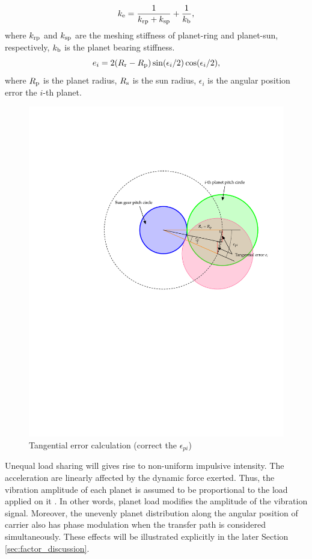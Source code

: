 \documentclass[a4paper,fleqn]{cas-sc}%
\begin{document}
\begin{equation}
    k_{\rm e}=\frac{1}{k_{\rm rp}+k_{\rm sp}}+\frac{1}{k_{\rm b}},\label{eq:stiffness}
\end{equation}
where $k_{\rm rp}$ and $k_{\rm sp}$ are the meshing stiffness of planet-ring and planet-sun, respectively, $k_{\rm b}$ is the planet bearing stiffness.
\begin{equation}
    e_{i}=2(R_{\rm r}-R_{\rm p})\sin(\epsilon_{i}/2)\cos(\epsilon_{i}/2),\label{eq:tangential_error}
\end{equation}
where $R_{\rm p}$ is the planet radius, $R_{\rm s}$ is the sun radius, $\epsilon_{i}$ is the angular position error the $i$-th planet.
\begin{figure}[pos=htbp]
    \centering
    \includegraphics[scale=0.5]{tangential_error.pdf}
    \caption{Tangential error calculation (correct the $\epsilon_{pi}$)}
    \label{fig:tangential_error}
\end{figure}
\par Unequal load sharing will gives rise to non-uniform impulsive intensity. The acceleration are linearly affected by the dynamic force exerted. Thus, the vibration amplitude of each planet is assumed to be proportional to the load applied on it \cite{Inalpolat2009}. In other words, planet load modifies the amplitude of the vibration signal. Moreover, the unevenly planet distribution along the angular position of carrier also has phase modulation when the transfer path is considered simultaneously. These effects will be illustrated explicitly in the later Section \ref{sec:factor_discussion}. 
\end{document}
